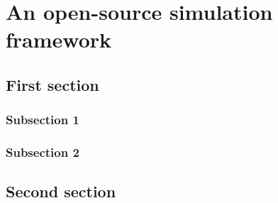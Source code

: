 \chapter{An open-source simulation framework \label{app:software}}
\minitoc

\section{First section}

\subsection{Subsection 1}

\lipsum[1-10]

\subsection{Subsection 2}

\lipsum[1-10]

\section{Second section}

\lipsum[1-10]
